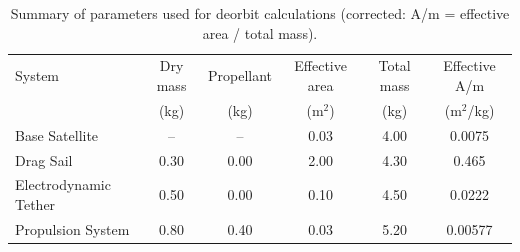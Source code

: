 \begin{table}[H]
\centering
\caption{Summary of parameters used for deorbit calculations (corrected: A/m = effective area / total mass).}
\label{tab:params}
\small
\begin{tabular}{lccccc}
\toprule
System & Dry mass & Propellant & Effective area & Total mass & Effective A/m \\
 & (kg) & (kg) & (m$^2$) & (kg) & (m$^2$/kg) \\
\midrule
Base Satellite & -- & -- & 0.03 & 4.00 & 0.0075 \\
Drag Sail & 0.30 & 0.00 & 2.00 & 4.30 & 0.465 \\
Electrodynamic Tether & 0.50 & 0.00 & 0.10 & 4.50 & 0.0222 \\
Propulsion System & 0.80 & 0.40 & 0.03 & 5.20 & 0.00577 \\
\bottomrule
\end{tabular}
\end{table}
